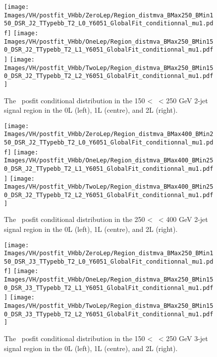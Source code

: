 
\begin{figure}[h!]
    \centering
    \texttt{[image: Images/VH/postfit\_VHbb/ZeroLep/Region\_distmva\_BMax250\_BMin150\_DSR\_J2\_TTypebb\_T2\_L0\_Y6051\_GlobalFit\_conditionnal\_mu1.pdf]}
    \texttt{[image:  Images/VH/postfit\_VHbb/OneLep/Region\_distmva\_BMax250\_BMin150\_DSR\_J2\_TTypebb\_T2\_L1\_Y6051\_GlobalFit\_conditionnal\_mu1.pdf]}
    \texttt{[image:  Images/VH/postfit\_VHbb/TwoLep/Region\_distmva\_BMax250\_BMin150\_DSR\_J2\_TTypebb\_T2\_L2\_Y6051\_GlobalFit\_conditionnal\_mu1.pdf]}
    \caption{The \vhb\ posfit conditional distribution in the 150 < \ptv\ < 250 GeV 2-jet signal region in the 0L (left), 1L (centre), and 2L (right).}
    \label{fig:plotsVHBSR_150pt_2J}
  \end{figure} 
  
  \begin{figure}[h!]
    \centering
    \texttt{[image: Images/VH/postfit\_VHbb/ZeroLep/Region\_distmva\_BMax400\_BMin250\_DSR\_J2\_TTypebb\_T2\_L0\_Y6051\_GlobalFit\_conditionnal\_mu1.pdf]}
    \texttt{[image:  Images/VH/postfit\_VHbb/OneLep/Region\_distmva\_BMax400\_BMin250\_DSR\_J2\_TTypebb\_T2\_L1\_Y6051\_GlobalFit\_conditionnal\_mu1.pdf]}
    \texttt{[image:  Images/VH/postfit\_VHbb/TwoLep/Region\_distmva\_BMax400\_BMin250\_DSR\_J2\_TTypebb\_T2\_L2\_Y6051\_GlobalFit\_conditionnal\_mu1.pdf]}
    \caption{The \vhb\ posfit conditional distribution in the 250 < \ptv\ < 400 GeV 2-jet signal region in the 0L (left), 1L (centre), and 2L (right).}
    \label{fig:plotsVHBSR_250pt_2J}
  \end{figure}
  
  \begin{figure}[h!]
    \centering
    \texttt{[image: Images/VH/postfit\_VHbb/ZeroLep/Region\_distmva\_BMax250\_BMin150\_DSR\_J3\_TTypebb\_T2\_L0\_Y6051\_GlobalFit\_conditionnal\_mu1.pdf]}
    \texttt{[image: Images/VH/postfit\_VHbb/OneLep/Region\_distmva\_BMax250\_BMin150\_DSR\_J3\_TTypebb\_T2\_L1\_Y6051\_GlobalFit\_conditionnal\_mu1.pdf]}
    \texttt{[image: Images/VH/postfit\_VHbb/TwoLep/Region\_distmva\_BMax250\_BMin150\_DSR\_J3\_TTypebb\_T2\_L2\_Y6051\_GlobalFit\_conditionnal\_mu1.pdf]}
    \caption{The \vhb\ posfit conditional distribution in the 150 < \ptv\ < 250 GeV 3-jet signal region in the 0L (left), 1L (centre), and 2L (right).}
    \label{fig:plotsVHBSR_150pt_3J}
  \end{figure} 
  
